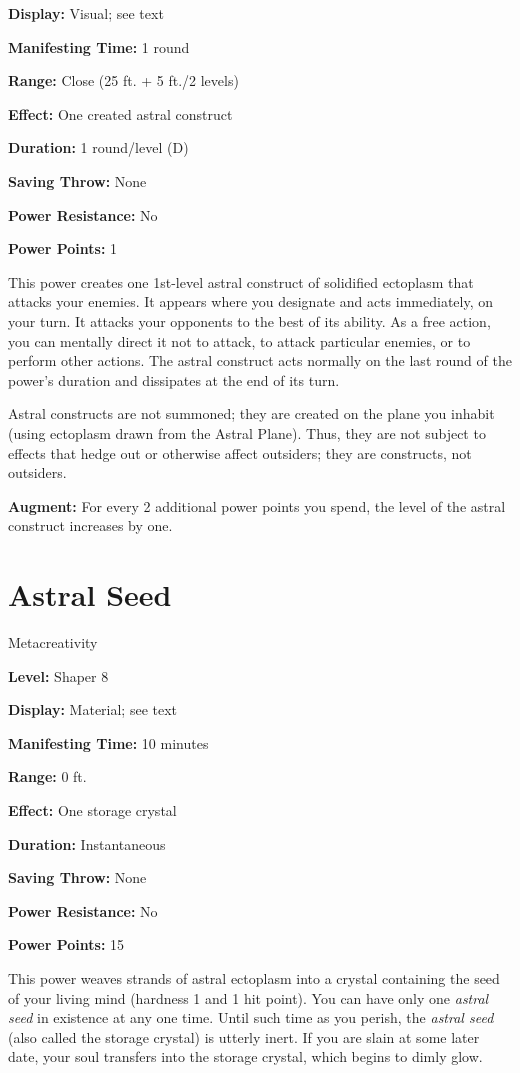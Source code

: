 \documentclass{article}
\begin{document}
\textbf{Display:} Visual; see text

\textbf{Manifesting Time:} 1 round

\textbf{Range:} Close (25 ft. + 5 ft./2 levels)

\textbf{Effect:} One created astral construct

\textbf{Duration:} 1 round/level (D)

\textbf{Saving Throw:} None

\textbf{Power Resistance:} No

\textbf{Power Points:} 1

This power creates one 1st-level astral construct of solidified ectoplasm that 
attacks your enemies. It appears where you designate and acts immediately, on your 
turn. It attacks your opponents to the best of its ability. As a free action, you 
can mentally direct it not to attack, to attack particular enemies, or to perform 
other actions. The astral construct acts normally on the last round of the power's 
duration and dissipates at the end of its turn.

Astral constructs are not summoned; they are created on the plane you inhabit (using 
ectoplasm drawn from the Astral Plane). Thus, they are not subject to effects that 
hedge out or otherwise affect outsiders; they are constructs, not outsiders.

\textbf{Augment:} For every 2 additional power points you spend, the level of the 
astral construct increases by one.

\vspace{12pt}
\section*{Astral Seed}

Metacreativity

\textbf{Level:} Shaper 8

\textbf{Display:} Material; see text

\textbf{Manifesting Time:} 10 minutes

\textbf{Range:} 0 ft.

\textbf{Effect:} One storage crystal

\textbf{Duration:} Instantaneous

\textbf{Saving Throw:} None

\textbf{Power Resistance:} No

\textbf{Power Points:} 15

This power weaves strands of astral ectoplasm into a crystal containing the seed 
of your living mind (hardness 1 and 1 hit point). You can have only one \textit{astral 
seed }in existence at any one time. Until such time as you perish, the \textit{astral 
seed }(also called the storage crystal) is utterly inert. If you are slain at some 
later date, your soul transfers into the storage crystal, which begins to dimly 
glow.
\end{document}
